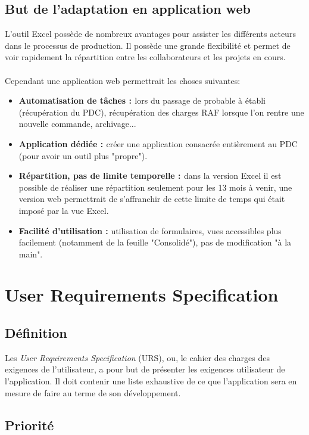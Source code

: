 \documentclass[french]{report}
\begin{document}
  \section{But de l'adaptation en application web}

L'outil Excel possède de nombreux avantages pour assister les différents acteurs
dans le processus de production. Il possède une grande flexibilité et permet de
voir rapidement la répartition entre les collaborateurs et les projets en
cours.\\\\
Cependant une application web permettrait les choses suivantes:
\begin{itemize}[label=\textbullet, font=\normalfont \color{blue}]
  \item{\bf{Automatisation de tâches : }} lors du passage de probable à établi
(récupération du PDC), récupération des charges RAF lorsque l'on rentre une
nouvelle commande, archivage...
  \item{\bf{Application dédiée : }} créer une application consacrée entièrement au
PDC (pour avoir un outil plus "propre").
  \item{\bf{Répartition, pas de limite temporelle : }} dans la version Excel il
est possible de réaliser une répartition seulement pour les 13 mois à venir,
une version web permettrait de s'affranchir de cette limite de temps qui était
imposé par la vue Excel.
  \item{\bf{Facilité d'utilisation :}} utilisation de formulaires, vues
accessibles plus facilement (notamment de la feuille "Consolidé"), pas de
modification "à la main".
\end {itemize}

\chapter{User Requirements Specification}
  \section{Définition}

Les \emph{User Requirements Specification} (URS), ou, le cahier des charges des
exigences de l’utilisateur, a pour but de présenter les exigences utilisateur de
l'application. Il doit contenir une liste exhaustive de ce que l'application sera
en mesure de faire au terme de son développement.

  \section{Priorité}
\end{document}
